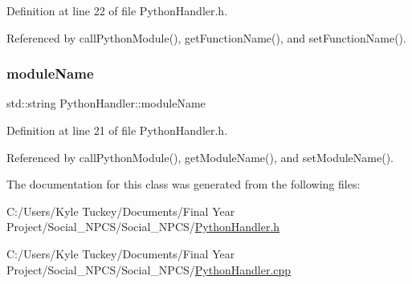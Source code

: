 Definition at line 22 of file Python\+Handler.\+h.



Referenced by call\+Python\+Module(), get\+Function\+Name(), and set\+Function\+Name().

\mbox{\label{class_python_handler_ae29ce86e7c2dce2340caa90ba1d6ac72}} 
\subsubsection{\texorpdfstring{module\+Name}{moduleName}}
{\footnotesize\ttfamily std\+::string Python\+Handler\+::module\+Name\hspace{0.3cm}{\ttfamily [private]}}



Definition at line 21 of file Python\+Handler.\+h.



Referenced by call\+Python\+Module(), get\+Module\+Name(), and set\+Module\+Name().



The documentation for this class was generated from the following files\+:\begin{DoxyCompactItemize}
\item 
C\+:/\+Users/\+Kyle Tuckey/\+Documents/\+Final Year Project/\+Social\+\_\+\+N\+P\+C\+S/\+Social\+\_\+\+N\+P\+C\+S/\hyperlink{_python_handler_8h}{Python\+Handler.\+h}\item 
C\+:/\+Users/\+Kyle Tuckey/\+Documents/\+Final Year Project/\+Social\+\_\+\+N\+P\+C\+S/\+Social\+\_\+\+N\+P\+C\+S/\hyperlink{_python_handler_8cpp}{Python\+Handler.\+cpp}\end{DoxyCompactItemize}
